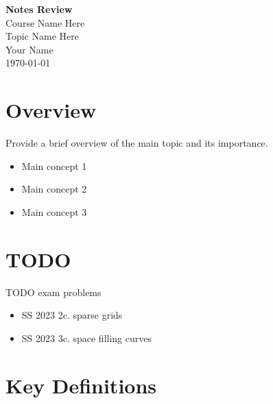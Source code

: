 \documentclass[11pt,a4paper]{article}
\newcommand{\coursename}{Course Name Here}
\newcommand{\topicname}{Topic Name Here}
\begin{document}
\begin{titlepage}
    \centering
    \vspace*{2cm}
    {\Huge \textbf{Notes Review}\\[0.5cm]}
    {\LARGE \coursename\\[0.3cm]}
    {\Large \topicname\\[1cm]}
    {\large Your Name\\[0.5cm]}
    {\large \today\\[2cm]}
    
    \begin{abstract}
        This document contains a comprehensive review of notes for [Course/Topic]. 
        It includes key concepts, formulas, examples, and practice problems.
    \end{abstract}
\end{titlepage}

\tableofcontents
\newpage

\section{Overview}

\begin{reviewbox}
    Provide a brief overview of the main topic and its importance.
    \begin{itemize}
        \item Main concept 1
        \item Main concept 2
        \item Main concept 3
    \end{itemize}
\end{reviewbox}

\section{TODO}

\begin{reviewbox}
    TODO exam problems
    \begin{itemize}
        \item SS 2023 2c. sparse grids
        \item SS 2023 3c. space filling curves
    \end{itemize}
\end{reviewbox}

\section{Key Definitions}
\end{document}
